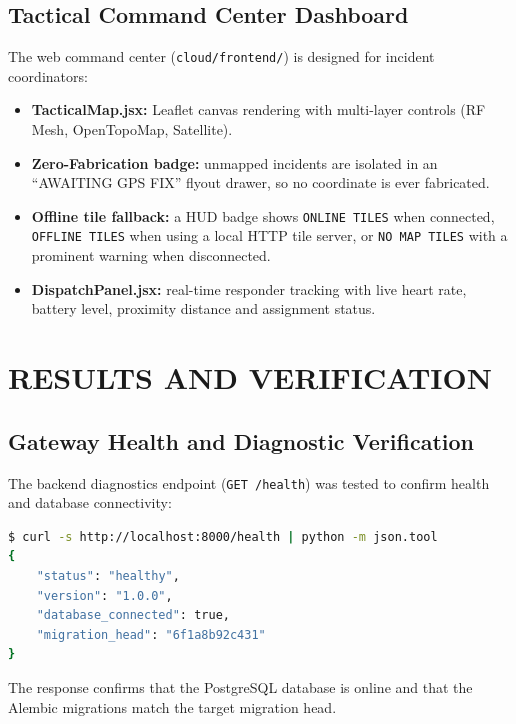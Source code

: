 \documentclass[12pt,a4paper]{report}
\begin{document}
\section{Tactical Command Center Dashboard}
The web command center (\texttt{cloud/frontend/}) is designed for incident coordinators:
\begin{itemize}
    \item \textbf{TacticalMap.jsx:} Leaflet canvas rendering with multi-layer controls (RF Mesh, OpenTopoMap, Satellite).
    \item \textbf{Zero-Fabrication badge:} unmapped incidents are isolated in an ``AWAITING GPS FIX'' flyout drawer, so no coordinate is ever fabricated.
    \item \textbf{Offline tile fallback:} a HUD badge shows \texttt{ONLINE TILES} when connected, \texttt{OFFLINE TILES} when using a local HTTP tile server, or \texttt{NO MAP TILES} with a prominent warning when disconnected.
    \item \textbf{DispatchPanel.jsx:} real-time responder tracking with live heart rate, battery level, proximity distance and assignment status.
\end{itemize}

\chapter{RESULTS AND VERIFICATION}

\section{Gateway Health and Diagnostic Verification}
The backend diagnostics endpoint (\texttt{GET /health}) was tested to confirm health and database connectivity:

\begin{lstlisting}[language=bash,caption={Real Execution Output -- Health Diagnostic Endpoint}]
$ curl -s http://localhost:8000/health | python -m json.tool
{
    "status": "healthy",
    "version": "1.0.0",
    "database_connected": true,
    "migration_head": "6f1a8b92c431"
}
\end{lstlisting}
The response confirms that the PostgreSQL database is online and that the Alembic migrations match the target migration head.
\end{document}
